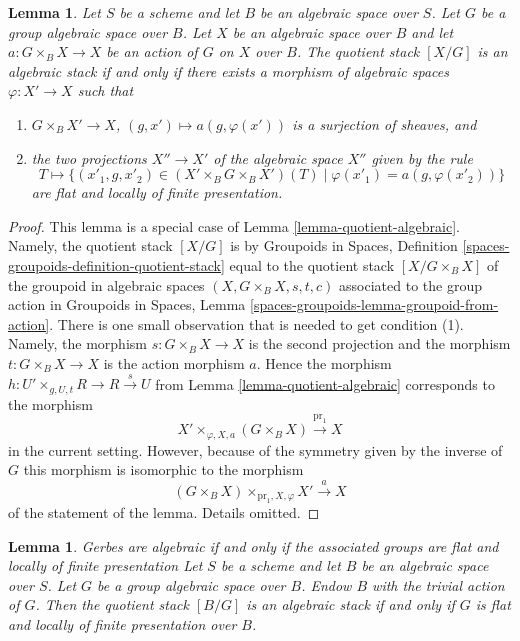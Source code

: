 \documentclass{stacks-project}
\newenvironment{slogan}{\comment}{\endcomment}
\theoremstyle{plain}
\newtheorem{lemma}[subsection]{Lemma}
\theoremstyle{definition}
\theoremstyle{remark}
\numberwithin{equation}{subsection}
\begin{document}
\begin{lemma}
\label{lemma-group-quotient-algebraic}
Let $S$ be a scheme and let $B$ be an algebraic space over $S$.
Let $G$ be a group algebraic space over $B$.
Let $X$ be an algebraic space over $B$ and let $a : G \times_B X \to X$
be an action of $G$ on $X$ over $B$.
The quotient stack $[X/G]$ is an algebraic stack if and only if
there exists a morphism of algebraic spaces $\varphi : X' \to X$ such that
\begin{enumerate}
\item $G \times_B X' \to X$, $(g, x') \mapsto a(g, \varphi(x'))$ is a
surjection of sheaves, and
\item the two projections $X'' \to X'$ of the algebraic space $X''$
given by the rule
$$
T \longmapsto \{(x'_1, g, x'_2) \in (X' \times_B G \times_B X')(T)
\mid \varphi(x'_1) = a(g, \varphi(x'_2))\}
$$
are flat and locally of finite presentation.
\end{enumerate}
\end{lemma}

\begin{proof}
This lemma is a special case of
Lemma \ref{lemma-quotient-algebraic}.
Namely, the quotient stack $[X/G]$ is by
Groupoids in Spaces, Definition \ref{spaces-groupoids-definition-quotient-stack}
equal to the quotient stack $[X/G \times_B X]$ of the groupoid in
algebraic spaces $(X, G \times_B X, s, t, c)$ associated to
the group action in
Groupoids in Spaces, Lemma \ref{spaces-groupoids-lemma-groupoid-from-action}.
There is one small observation that is needed to get condition (1).
Namely, the morphism $s : G \times_B X \to X$ is the second projection
and the morphism $t :  G \times_B X \to X$ is the action morphism $a$.
Hence the morphism $h : U' \times_{g, U, t} R \to R \xrightarrow{s} U$ from
Lemma \ref{lemma-quotient-algebraic}
corresponds to the morphism
$$
X' \times_{\varphi, X, a} (G \times_B X) \xrightarrow{\text{pr}_1} X
$$
in the current setting. However, because of the symmetry given by
the inverse of $G$ this morphism is isomorphic to the morphism
$$
(G \times_B X) \times_{\text{pr}_1, X, \varphi} X' \xrightarrow{a} X
$$
of the statement of the lemma. Details omitted.
\end{proof}

\begin{lemma}
\label{lemma-BG-algebraic}
\begin{slogan}
Gerbes are algebraic if and only if the associated groups are flat
and locally of finite presentation
\end{slogan}
Let $S$ be a scheme and let $B$ be an algebraic space over $S$.
Let $G$ be a group algebraic space over $B$.
Endow $B$ with the trivial action of $G$.
Then the quotient stack $[B/G]$ is an algebraic stack
if and only if $G$ is flat and locally of finite presentation over $B$.
\end{lemma}
\end{document}
